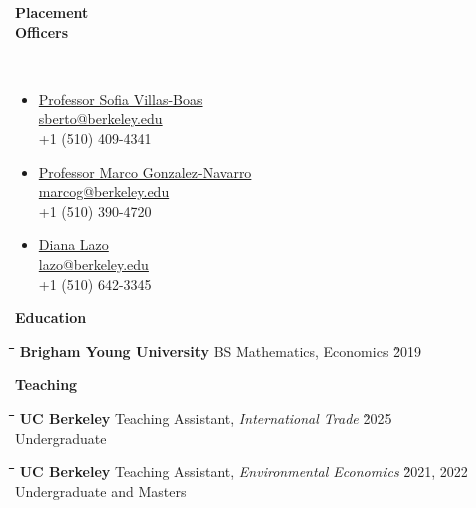 \documentclass[10pt, oneside]{article}
\newcommand\mytabs{\hspace*{1cm}\=\hspace{1cm}\=\hspace{1cm}\=\hspace{1cm}\=\hspace{1cm}\=\hspace{1cm}\=\hspace{1cm}\=\hspace{1cm}\=\hspace{1cm}\=\hspace{1cm}}
\newenvironment{mysec}[1][\mytabs]
  {\begin{tabbing}#1\kill\ignorespaces}
  {\end{tabbing}}
\begin{document}
\begin{minipage}[t]{0.1\linewidth}
\textbf{Placement\\ Officers}
\end{minipage}\hspace{0.04\linewidth}
\begin{minipage}[t]{0.9\linewidth}~\vspace{-9mm}
\begin{multicols}{3}
\begin{itemize}[noitemsep,nolistsep]
\item[] \underline{Professor Sofia Villas-Boas} \\
\href{mailto:sberto@berkeley.edu}{sberto@berkeley.edu} \\
+1 (510) 409-4341 \\
\item[] \underline{Professor Marco Gonzalez-Navarro} \\
\href{mailto:marcog@berkeley.edu}{marcog@berkeley.edu} \\
+1 (510) 390-4720 \\
\item[] \underline{Diana Lazo} \\
\href{mailto:lazo@berkeley.edu}{lazo@berkeley.edu} \\
+1 (510) 642-3345 
\end{itemize}
\end{multicols}
\end{minipage}\vspace{5mm}

\begin{minipage}[t]{0.1\linewidth}
\textbf{Education}
\end{minipage}\hspace{0.05\linewidth}
\begin{minipage}[t]{0.8\linewidth}
\begin{mysec} 
    \textbf{Brigham Young University} \>\>\>\>\> BS Mathematics, Economics \` 2019 
\end{mysec} 
\end{minipage}\vspace{5mm}

\begin{minipage}[t]{0.1\linewidth}
\textbf{Teaching}
\end{minipage}\hspace{0.05\linewidth}
\begin{minipage}[t]{0.8\linewidth}
\begin{mysec} 
\textbf{UC Berkeley} \>\>\>\>\>Teaching Assistant, \emph{International Trade}  \` 2025 \\
\>\>\>\>\> Undergraduate
\end{mysec}
\begin{mysec} 
\textbf{UC Berkeley} \>\>\>\>\>Teaching Assistant, \emph{Environmental Economics}  \` 2021, 2022 \\
\>\>\>\>\> Undergraduate and Masters
\end{mysec}
\end{minipage}\vspace{5mm}
\end{document}
